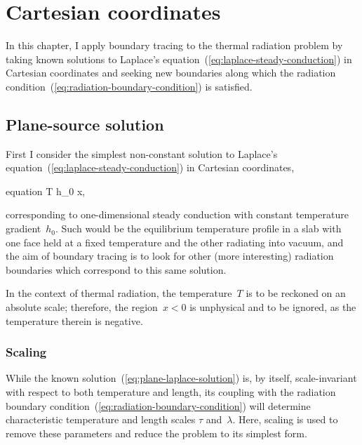 \chapter{Cartesian coordinates}
\label{ch:cartesian}

In this chapter,
I apply boundary tracing to the thermal radiation problem
by taking known solutions
to Laplace's equation~(\ref{eq:laplace-steady-conduction})
in Cartesian coordinates
and seeking new boundaries along which
the radiation condition~(\ref{eq:radiation-boundary-condition})
is satisfied.

\section{Plane-source solution}
\label{sec:cartesian.plane}

First I consider the simplest non-constant solution
to Laplace's equation~(\ref{eq:laplace-steady-conduction})
in Cartesian coordinates,
\begin{important}{equation}
  T \ideq h_0 x,
  \label{eq:plane-laplace-solution}
\end{important}
corresponding to one-dimensional steady conduction
with constant temperature gradient~$h_0$.
Such would be the equilibrium temperature profile in a slab
with one face held at a fixed temperature
and the other radiating into vacuum,
and the aim of boundary tracing
is to look for other (more interesting) radiation boundaries
which correspond to this same solution.

In the context of thermal radiation,
the temperature~$T$ is to be reckoned on an absolute scale;
therefore, the region~$x < 0$ is unphysical and to be ignored,
as the temperature therein is negative.

\subsection{Scaling}
\label{sec:cartesian.plane.scaling}

While the known solution~(\ref{eq:plane-laplace-solution}) is, by itself,
scale-invariant with respect to both temperature and length,
its coupling with
the radiation boundary condition~(\ref{eq:radiation-boundary-condition})
will determine characteristic temperature and length scales
$\tau$ and~$\lambda$.
Here, scaling is used to remove these parameters
and reduce the problem to its simplest form.

